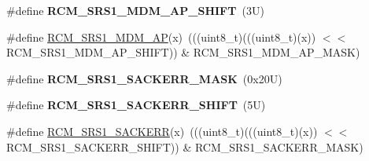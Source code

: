 \begin{DoxyCompactItemize}
\#define {\bfseries R\+C\+M\+\_\+\+S\+R\+S1\+\_\+\+M\+D\+M\+\_\+\+A\+P\+\_\+\+S\+H\+I\+FT}~(3\+U)
\item 
\#define \mbox{\hyperlink{group___r_c_m___register___masks_ga2e9238a5208d08d3f22f20dc0e512629}{R\+C\+M\+\_\+\+S\+R\+S1\+\_\+\+M\+D\+M\+\_\+\+AP}}(x)~(((uint8\+\_\+t)(((uint8\+\_\+t)(x)) $<$$<$ R\+C\+M\+\_\+\+S\+R\+S1\+\_\+\+M\+D\+M\+\_\+\+A\+P\+\_\+\+S\+H\+I\+FT)) \& R\+C\+M\+\_\+\+S\+R\+S1\+\_\+\+M\+D\+M\+\_\+\+A\+P\+\_\+\+M\+A\+SK)
\item 
\mbox{\label{group___r_c_m___register___masks_gaa09459c8ed6200a5828221f9d15656d3}} 
\#define {\bfseries R\+C\+M\+\_\+\+S\+R\+S1\+\_\+\+S\+A\+C\+K\+E\+R\+R\+\_\+\+M\+A\+SK}~(0x20\+U)
\item 
\mbox{\label{group___r_c_m___register___masks_gab30a0b3f954edb8a480649686bd208fb}} 
\#define {\bfseries R\+C\+M\+\_\+\+S\+R\+S1\+\_\+\+S\+A\+C\+K\+E\+R\+R\+\_\+\+S\+H\+I\+FT}~(5\+U)
\item 
\#define \mbox{\hyperlink{group___r_c_m___register___masks_ga3cc2a42f8139fea40cc153345c0deed9}{R\+C\+M\+\_\+\+S\+R\+S1\+\_\+\+S\+A\+C\+K\+E\+RR}}(x)~(((uint8\+\_\+t)(((uint8\+\_\+t)(x)) $<$$<$ R\+C\+M\+\_\+\+S\+R\+S1\+\_\+\+S\+A\+C\+K\+E\+R\+R\+\_\+\+S\+H\+I\+FT)) \& R\+C\+M\+\_\+\+S\+R\+S1\+\_\+\+S\+A\+C\+K\+E\+R\+R\+\_\+\+M\+A\+SK)
\end{DoxyCompactItemize}
